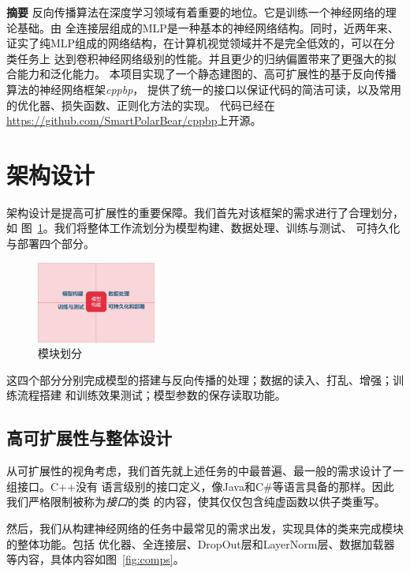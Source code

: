\documentclass[a4paper,twoside,twocolumn]{article}
\begin{document}
\begin{spacing}{1.2}

\noindent\textbf{摘要 }
反向传播算法在深度学习领域有着重要的地位。它是训练一个神经网络的理论基础。由
全连接层组成的MLP是一种基本的神经网络结构。同时，近两年来\cite{mlpmixer}、\cite{resmlp}
证实了纯MLP组成的网络结构，在计算机视觉领域并不是完全低效的，可以在分类任务上
达到卷积神经网络级别的性能。并且更少的归纳偏置带来了更强大的拟合能力和泛化能力。
本项目实现了一个静态建图的、高可扩展性的基于反向传播算法的神经网络框架\emph{cppbp}，
提供了统一的接口以保证代码的简洁可读，以及常用的优化器、损失函数、正则化方法的实现。
代码已经在\url{https://github.com/SmartPolarBear/cppbp}上开源。

\vspace*{0.15cm}

\section{架构设计}

架构设计是提高可扩展性的重要保障。我们首先对该框架的需求进行了合理划分，如
图~\ref{fig:mdl_spl}。我们将整体工作流划分为模型构建、数据处理、训练与测试、
可持久化与部署四个部分。
\begin{figure}[htb]
	\centering
	\caption{模块划分}
	\label{fig:mdl_spl}
	\includegraphics[width=0.35\textwidth]{module_split.png}
\end{figure}

这四个部分分别完成模型的搭建与反向传播的处理；数据的读入、打乱、增强；训练流程搭建
和训练效果测试；模型参数的保存读取功能。

\subsection{高可扩展性与整体设计}

从可扩展性的视角考虑，我们首先就上述任务的中最普遍、最一般的需求设计了一组接口。C++没有
语言级别的接口定义，像Java和C\#等语言具备的那样。因此我们严格限制被称为\emph{接口}的类
的内容，使其仅仅包含纯虚函数以供子类重写。

然后，我们从构建神经网络的任务中最常见的需求出发，实现具体的类来完成模块的整体功能。包括
优化器、全连接层、DropOut层和LayerNorm层、数据加载器等内容，具体内容如图~\ref{fig:comps}。


\end{spacing}
\end{document}
